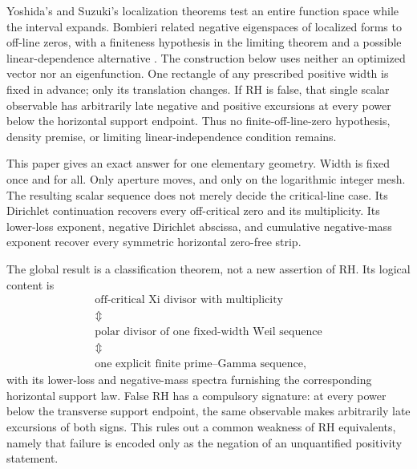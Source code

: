 \documentclass[11pt]{article}
\begin{document}
Yoshida's and Suzuki's localization theorems test an entire function space while the interval
expands.  Bombieri related negative eigenspaces of localized forms to off-line zeros, with a
finiteness hypothesis in the limiting theorem and a possible linear-dependence alternative
\cite{Yoshida1992,Bombieri2000,Bombieri2003,Suzuki2026}.  The construction below uses neither an
optimized vector nor an eigenfunction.  One rectangle of any prescribed positive width is fixed
in advance; only its translation changes.  If RH is false, that single scalar observable has
arbitrarily late negative and positive excursions at every power below the horizontal support
endpoint.  Thus no finite-off-line-zero hypothesis, density premise, or limiting
linear-independence condition remains.

This paper gives an exact answer for one elementary geometry.  Width is fixed once and for all.
Only aperture moves, and only on the logarithmic integer mesh.  The resulting scalar sequence
does not merely decide the critical-line case.  Its Dirichlet continuation recovers every
off-critical zero and its multiplicity.  Its lower-loss exponent, negative Dirichlet abscissa,
and cumulative negative-mass exponent recover every symmetric horizontal zero-free strip.

The global result is a classification theorem, not a new assertion of RH.  Its logical content is
\[
\begin{gathered}
 \text{off-critical Xi divisor with multiplicity}\\
 \Updownarrow\\
 \text{polar divisor of one fixed-width Weil sequence}\\
 \Updownarrow\\
 \text{one explicit finite prime--Gamma sequence},
\end{gathered}
\tag{1.2}
\]
with its lower-loss and negative-mass spectra furnishing the corresponding horizontal support
law.
False RH has a compulsory signature: at every power below the transverse support endpoint, the
same observable makes arbitrarily late excursions of both signs.  This rules out a common
weakness of RH equivalents, namely that failure is encoded only as the negation of an unquantified
positivity statement.
\end{document}

